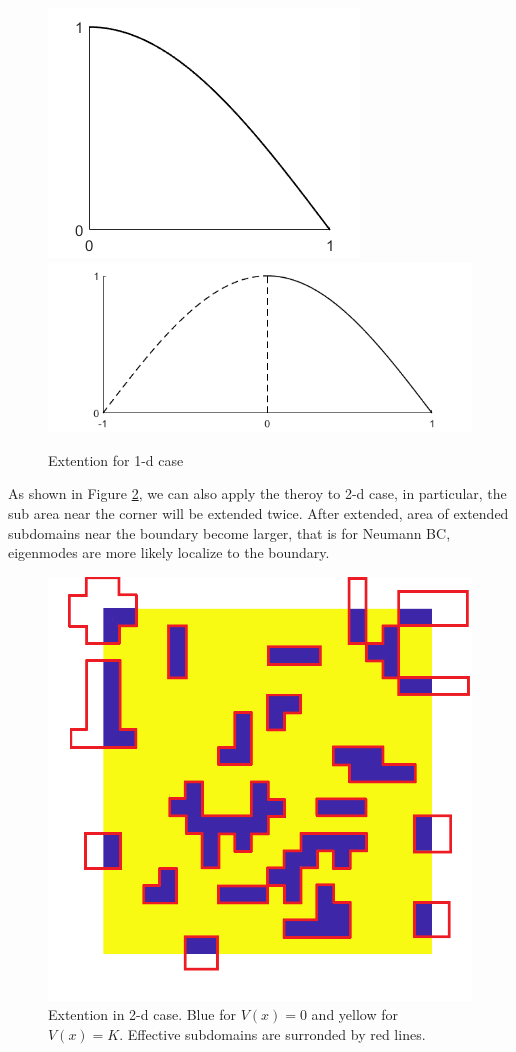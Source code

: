 \documentclass[12pt,a4paper]{article}
\begin{document}
\begin{figure}[h]
\centering
\includegraphics[height=0.15\textheight]{DN}
\includegraphics[height=0.15\textheight]{DD}
\caption{Extention for 1-d case}
\label{fig:BC}
\end{figure}

As shown in Figure \ref{fig:BC2}, we can also apply the theroy to 2-d case, in particular, the sub area near the corner will be extended twice. After extended, area of extended subdomains near the boundary become larger, that is for Neumann BC, eigenmodes are more likely localize to the boundary.

\begin{figure}[h]
\centering
\includegraphics[width=0.33\linewidth]{BC2}
\caption{Extention in 2-d case. Blue for $V(x) = 0$ and yellow for $V(x) = K$. Effective subdomains are surronded by red lines.}
\label{fig:BC2}
\end{figure}
\end{document}
